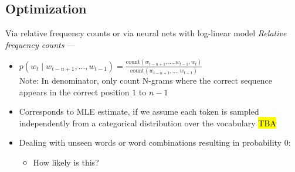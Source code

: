\subsection*{Optimization}
Via relative frequency counts or via neural nets with log-linear model
\emph{Relative frequency counts} ---
\begin{itemize}
    \item $
    p(w_t \mid w_{t-n+1}, \ldots, w_{t-1}) = \frac{\text{count}(w_{t-n+1}, \ldots, w_{t-1}, w_t)}{\text{count}(w_{t-n+1}, \ldots, w_{t-1})}
    $\\
    Note:  In denominator, only count N-grams where the correct sequence appears in the correct position $1$ to $n-1$
    \item Corresponds to MLE estimate, if we assume each token is sampled independently from a categorical distribution over the vocabulary
    \hl{TBA}
    \item Dealing with unseen words or word combinations resulting in probability $0$:
    \begin{itemize}
        \item How likely is this?
\end{itemize}
\end{itemize}
